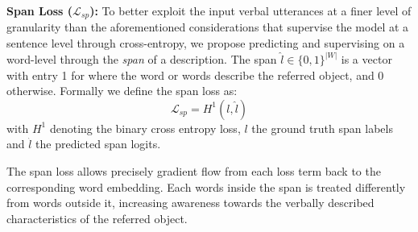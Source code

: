 \documentclass[10pt,twocolumn,letterpaper]{article}
\begin{document}
\vspace{5px}
\noindent\textbf{Span Loss ($\mathcal{L}_{sp}$):} To better exploit the input verbal utterances at a finer level of granularity than the aforementioned considerations that supervise the model at a sentence level through cross-entropy, we propose predicting and supervising on a word-level through the \textit{span} of a description. The span $\hat{l} \in \{0,1\}^{|W|}$ is a vector with entry 1 for where the word or words describe the referred object, and 0 otherwise. Formally we define the span loss as:
\begin{equation}
    \mathcal{L}_{sp} = H^1(l,\hat{l})
\end{equation}
with $H^1$ denoting the binary cross entropy loss, $l$ the ground truth span labels and $\hat{l}$ the predicted span logits.

The span loss allows precisely gradient flow from each loss term back to the corresponding word embedding. Each words inside the span is treated differently from words outside it, increasing awareness towards the verbally described characteristics of the referred object.
\end{document}
